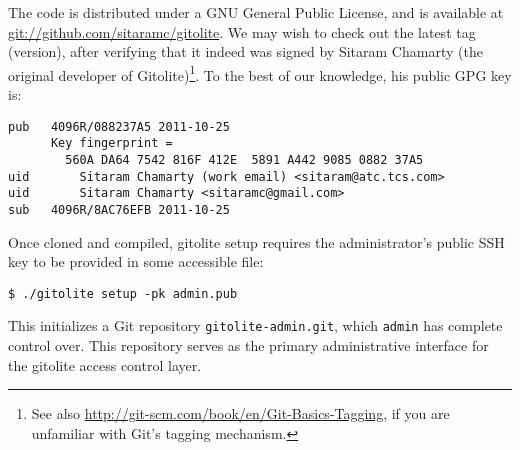 The code is distributed under a GNU General Public License, and is available at
\url{git://github.com/sitaramc/gitolite}. We may wish to check out the latest
tag (version), after verifying that it indeed was signed by Sitaram Chamarty
(the original developer of Gitolite)\footnote{See also
\url{http://git-scm.com/book/en/Git-Basics-Tagging}, if you are unfamiliar with
Git's tagging mechanism.}. To the best of our knowledge, his public GPG key is:

\begin{lstlisting}
pub   4096R/088237A5 2011-10-25
      Key fingerprint =
        560A DA64 7542 816F 412E  5891 A442 9085 0882 37A5
uid       Sitaram Chamarty (work email) <sitaram@atc.tcs.com>
uid       Sitaram Chamarty <sitaramc@gmail.com>
sub   4096R/8AC76EFB 2011-10-25
\end{lstlisting}

Once cloned and compiled, gitolite setup requires the administrator's public
SSH key to be provided in some accessible file:

\begin{lstlisting}
$ ./gitolite setup -pk admin.pub
\end{lstlisting}

This initializes a Git repository \texttt{gitolite-admin.git}, which
\texttt{admin} has complete control over. This repository serves as the primary
administrative interface for the gitolite access control layer.
